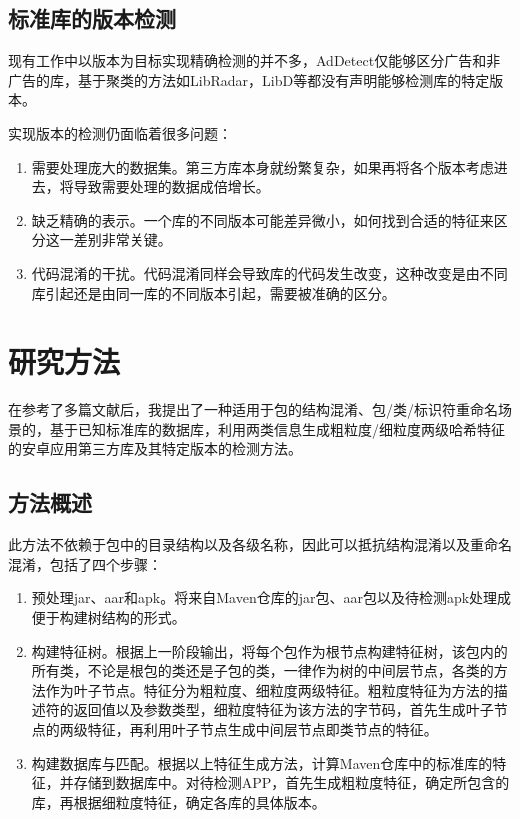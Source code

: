 \section{标准库的版本检测}

现有工作中以版本为目标实现精确检测的并不多，AdDetect\cite{narayanan2014addetect}仅能够区分广告和非广告的库，基于聚类的方法如LibRadar\cite{ma2016libradar}，LibD\cite{li2017libd}等都没有声明能够检测库的特定版本。

实现版本的检测仍面临着很多问题：
\begin{enumerate}
\item{需要处理庞大的数据集。第三方库本身就纷繁复杂，如果再将各个版本考虑进去，将导致需要处理的数据成倍增长。}
\item{缺乏精确的表示。一个库的不同版本可能差异微小，如何找到合适的特征来区分这一差别非常关键。}
\item{代码混淆的干扰。代码混淆同样会导致库的代码发生改变，这种改变是由不同库引起还是由同一库的不同版本引起，需要被准确的区分。}
\end{enumerate}



\chapter{研究方法}

在参考了多篇文献后，我提出了一种适用于包的结构混淆、包/类/标识符重命名场景的，基于已知标准库的数据库，利用两类信息生成粗粒度/细粒度两级哈希特征的安卓应用第三方库及其特定版本的检测方法。



\section{方法概述}

此方法不依赖于包中的目录结构以及各级名称，因此可以抵抗结构混淆以及重命名混淆，包括了四个步骤：
\begin{enumerate}
\item{预处理jar、aar和apk。将来自Maven仓库的jar包、aar包以及待检测apk处理成便于构建树结构的形式。}
\item{构建特征树。根据上一阶段输出，将每个包作为根节点构建特征树，该包内的所有类，不论是根包的类还是子包的类，一律作为树的中间层节点，各类的方法作为叶子节点。特征分为粗粒度、细粒度两级特征。粗粒度特征为方法的描述符的返回值以及参数类型，细粒度特征为该方法的字节码，首先生成叶子节点的两级特征，再利用叶子节点生成中间层节点即类节点的特征。}
\item{构建数据库与匹配。根据以上特征生成方法，计算Maven仓库中的标准库的特征，并存储到数据库中。对待检测APP，首先生成粗粒度特征，确定所包含的库，再根据细粒度特征，确定各库的具体版本。}
\end{enumerate}



